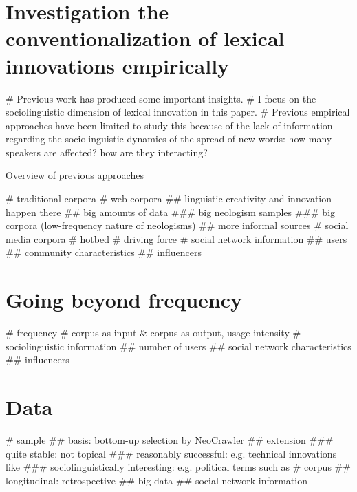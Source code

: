 \documentclass[
  a4paper,
  ]{scrartcl}
\begin{document}
\section{Investigation the conventionalization of lexical innovations empirically}

  \begin{easylist}[itemize]
    # Previous work has produced some important insights.
    # I focus on the sociolinguistic dimension of lexical innovation in this paper.
    # Previous empirical approaches have been limited to study this because of the lack of information regarding the sociolinguistic dynamics of the spread of new words: how many speakers are affected? how are they interacting?
  \end{easylist}

  Overview of previous approaches

    \begin{easylist}[itemize]
      # traditional corpora \parencite{Elsen2004}
      # web corpora \cite{Renouf2006,Kerremans2012}
        ## linguistic creativity and innovation happen there
        ## big amounts of data
          ### big neologism samples
          ### big corpora (low-frequency nature of neologisms)
        ## more informal sources
      # social media corpora \cite{Grieve2016,Eisenstein2014}
        # hotbed
        # driving force
        # social network information
          ## users
          ## community characteristics
          ## influencers
    \end{easylist}

\section{Going beyond frequency}

  \begin{easylist}[itemize]
    # frequency
    # corpus-as-input \& corpus-as-output, usage intensity \parencite{Stefanowitsch2017}
    # sociolinguistic information
      ## number of users
      ## social network characteristics
      ## influencers
  \end{easylist}

\section{Data}

  \begin{easylist}[itemize]
    # sample
      ## basis: bottom-up selection by NeoCrawler \parencite{Kerremans2018}
      ## extension
        ### quite stable: not topical
        ### reasonably successful: e.g. technical innovations like 
        ### sociolinguistically interesting: e.g. political terms such as 
    # corpus
      ## longitudinal: retrospective
      ## big data
      ## social network information
  \end{easylist}
\end{document}
